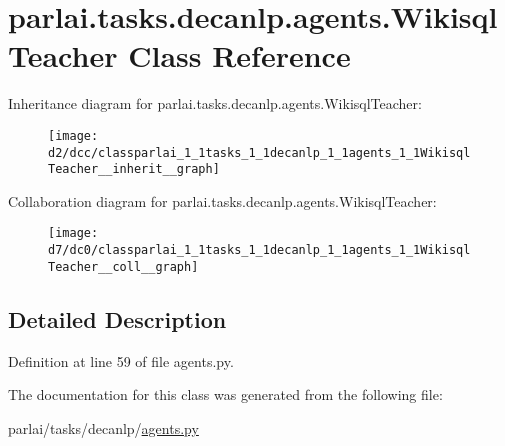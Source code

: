 \hypertarget{classparlai_1_1tasks_1_1decanlp_1_1agents_1_1WikisqlTeacher}{}\section{parlai.\+tasks.\+decanlp.\+agents.\+Wikisql\+Teacher Class Reference}
\label{classparlai_1_1tasks_1_1decanlp_1_1agents_1_1WikisqlTeacher}


Inheritance diagram for parlai.\+tasks.\+decanlp.\+agents.\+Wikisql\+Teacher\+:\nopagebreak
\begin{figure}[H]
\begin{center}
\leavevmode
\texttt{[image: d2/dcc/classparlai\_1\_1tasks\_1\_1decanlp\_1\_1agents\_1\_1WikisqlTeacher\_\_inherit\_\_graph]}
\end{center}
\end{figure}


Collaboration diagram for parlai.\+tasks.\+decanlp.\+agents.\+Wikisql\+Teacher\+:\nopagebreak
\begin{figure}[H]
\begin{center}
\leavevmode
\texttt{[image: d7/dc0/classparlai\_1\_1tasks\_1\_1decanlp\_1\_1agents\_1\_1WikisqlTeacher\_\_coll\_\_graph]}
\end{center}
\end{figure}


\subsection{Detailed Description}


Definition at line 59 of file agents.\+py.



The documentation for this class was generated from the following file\+:\begin{DoxyCompactItemize}
\item 
parlai/tasks/decanlp/\hyperlink{parlai_2tasks_2decanlp_2agents_8py}{agents.\+py}\end{DoxyCompactItemize}
